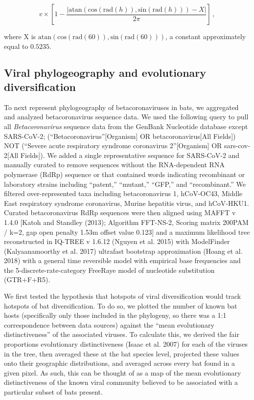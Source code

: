 \documentclass[11pt]{article}
\begin{document}
\[
v\times\left[1-\frac{\left|\text{atan}\left(\text{cos}(\text{rad}(h)), \text{sin}(\text{rad}(h))\right) - X\right|}{2\pi}\right]\,,
\]

where X is
\(\text{atan}\left(\text{cos}(\text{rad}(60)), \text{sin}(\text{rad}(60))\right)\),
a constant approximately equal to \(0.5235\).

\hypertarget{viral-phylogeography-and-evolutionary-diversification}{%
\subsection{Viral phylogeography and evolutionary
diversification}\label{viral-phylogeography-and-evolutionary-diversification}}

To next represent phylogeography of betacoronaviruses in bats, we
aggregated and analyzed betacoronavirus sequence data. We used the
following query to pull all \emph{Betacoronavirus} sequence data from
the GenBank Nucleotide database except SARS-CoV-2;
(``Betacoronavirus''{[}Organism{]} OR betacoronavirus{[}All Fields{]})
NOT (``Severe acute respiratory syndrome coronavirus 2''{[}Organism{]}
OR sars-cov-2{[}All Fields{]}). We added a single representative
sequence for SARS-CoV-2 and manually curated to remove sequences without
the RNA-dependent RNA polymerase (RdRp) sequence or that contained words
indicating recombinant or laboratory strains including ``patent,''
``mutant,'' ``GFP,'' and ``recombinant.'' We filtered over-represented
taxa including betacoronavirus 1, hCoV-OC43, Middle East respiratory
syndrome coronavirus, Murine hepatitis virus, and hCoV-HKU1. Curated
betacoronavirus RdRp sequences were then aligned using MAFFT v 1.4.0
{[}Katoh and Standley (2013); Algorithm FFT-NS-2, Scoring matrix 200PAM
/ k=2, gap open penalty 1.53m offset value 0.123{]} and a maximum
likelihood tree reconstructed in IQ-TREE v 1.6.12 (Nguyen et al. 2015)
with ModelFinder (Kalyaanamoorthy et al. 2017) ultrafast bootstrap
approximation (Hoang et al. 2018) with a general time reversible model
with empirical base frequencies and the 5-discrete-rate-category
FreeRaye model of nucleotide substitution (GTR+F+R5).

We first tested the hypothesis that hotspots of viral diversification
would track hotspots of bat diversification. To do so, we plotted the
number of known bat hosts (specifically only those included in the
phylogeny, so there was a 1:1 correspondence between data sources)
against the ``mean evolutionary distinctiveness'' of the associated
viruses. To calculate this, we derived the fair proportions evolutionary
distinctiveness (Isaac et al. 2007) for each of the viruses in the tree,
then averaged these at the bat species level, projected these values
onto their geographic distributions, and averaged across every bat found
in a given pixel. As such, this can be thought of as a map of the mean
evolutionary distinctiveness of the known viral community believed to be
associated with a particular subset of bats present.
\end{document}
